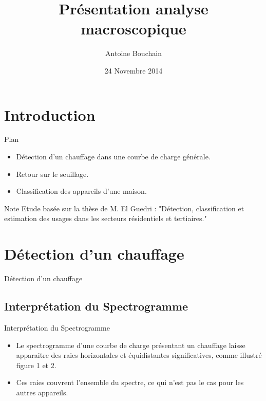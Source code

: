 \documentclass{beamer}
\title[Your Short Title]{Présentation analyse macroscopique}
\author{Antoine Bouchain}
\date{24 Novembre 2014}
\begin{document}
\begin{frame}
  \titlepage
\end{frame}


\section{Introduction}

\begin{frame}{Plan}

\begin{itemize}
  \item Détection d'un chauffage dans une courbe de charge générale.
  \item Retour sur le seuillage.
  \item Classification des appareils d'une maison.
\end{itemize}

\vskip 1cm

\begin{block}{Note}
Etude basée sur la thèse de M. El Guedri : "Détection, classification et estimation des usages dans les secteurs résidentiels et tertiaires."
\end{block}

\end{frame}

\section{Détection d'un chauffage}

\begin{frame}{Détection d'un chauffage}
\end{frame}

\subsection{Interprétation du Spectrogramme}

\begin{frame}{Interprétation du Spectrogramme}
\begin{itemize}
	\item Le spectrogramme d'une courbe de charge présentant un chauffage laisse apparaitre des raies horizontales et équidistantes significatives, comme illustré figure 1 et 2.
	\item Ces raies couvrent l'ensemble du spectre, ce qui n'est pas le cas pour les autres appareils.
\end{itemize}
\end{frame}
\end{document}
